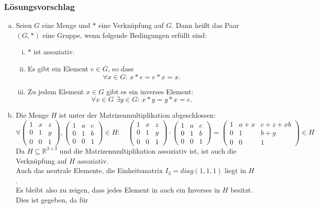 \documentclass[a4paper,11pt]{scrartcl}
\newcounter{auf}
\newcommand{\RR}{\mathbb{R}}
\begin{document}
\subsubsection*{Lösungsvorschlag}
\begin{enumerate}[a)]
\item Seien $G$ eine Menge und $\ast$ eine Verknüpfung auf $G$.
	Dann heißt das Paar $(G,\ast)$ eine  Gruppe, wenn folgende Bedingungen erfüllt sind:
	\begin{enumerate}[i)]
		\item $\ast$ ist assoziativ. 
		\item Es gibt ein Element $e\in G$, so dass
			$$
				\forall x\in G:\, x\ast e = e\ast x = x.
			$$

		\item Zu jedem Element $x\in G$ gibt es ein inverses Element:
			$$
				\forall x\in G\,\, \exists y\in G:\, x\ast y = y\ast x = e.
			$$
	\end{enumerate}
\item Die Menge $H$ ist unter der Matrizenmultiplikation abgeschlossen:
$$
 \forall \begin{pmatrix} 1&x&z\\0&1&y\\0&0&1 \end{pmatrix}, \begin{pmatrix} 1&a&c\\0&1&b\\0&0&1 \end{pmatrix} \in H: \quad \begin{pmatrix} 1&x&z\\0&1&y\\0&0&1 \end{pmatrix} \cdot \begin{pmatrix} 1&a&c\\0&1&b\\0&0&1 \end{pmatrix} =\begin{pmatrix} 1&a+x&c+z+xb\\0&1&b+y\\0&0&1 \end{pmatrix} \in H 
$$
Da $H \subseteq \RR^{3\times 3}$ und die Matrizenmultiplikation assoziativ ist, ist auch die Verknüpfung auf $H$ assoziativ.\\
Auch das neutrale Elemente, die Einheitsmatrix $I_3=diag(1,1,1)$ liegt in $H$.\\
Es bleibt also zu zeigen, dass jedes Element in auch ein Inverses in $H$ besitzt. Dies ist gegeben, da für 

\end{enumerate}
\end{document}
